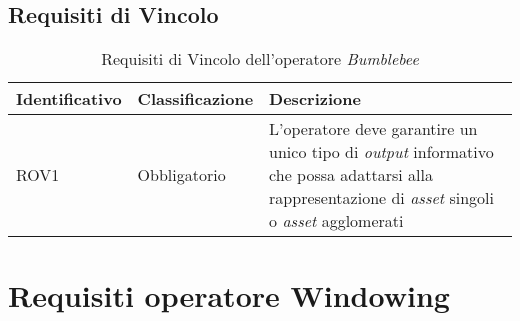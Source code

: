 \subsection{Requisiti di Vincolo}
{
\centering
\begin{longtable}{L{3cm} L{3cm} L{7.5cm}}
\caption{Requisiti di Vincolo dell'operatore \textit{Bumblebee}}\\
\textbf{Identificativo} &
\textbf{Classificazione}&
\textbf{Descrizione}\\
\endhead
\hline

ROV1 & Obbligatorio & L'operatore deve garantire un unico tipo di \textit{output} informativo che possa adattarsi alla rappresentazione di \textit{asset} singoli o \textit{asset} agglomerati\\
\hline
\end{longtable}
}





\section{Requisiti operatore Windowing}
